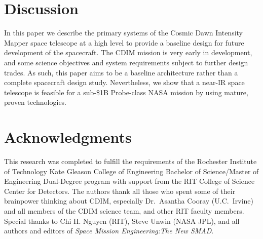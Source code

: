 \documentclass{ws-jai}
\begin{document}
\section{Discussion}
\label{sec:conclusion}
In this paper we describe the primary systems of the Cosmic Dawn Intensity Mapper space telescope at a high level to provide a baseline design for future development of the spacecraft.
The CDIM mission is very early in development, and some science objectives and system requirements subject to further design trades.
As such, this paper aims to be a baseline architecture rather than a complete spacecraft design study.
Nevertheless, we show that a near-IR space telescope is feasible for a sub-\$1B Probe-class NASA mission by using mature, proven technologies.

\section*{Acknowledgments}
This research was completed to fulfill the requirements of the Rochester Institute of Technology Kate Gleason College of Engineering Bachelor of Science/Master of Engineering Dual-Degree program with support from the RIT College of Science Center for Detectors.
The authors thank all those who spent some of their brainpower thinking about CDIM, especially Dr.\ Asantha Cooray (U.C.\ Irvine) and all members of the CDIM science team, and other RIT faculty members.
Special thanks to Chi H. Nguyen (RIT), Steve Unwin (NASA JPL), and all authors and editors of \emph{Space Mission Engineering:The New SMAD}.


\end{document}
